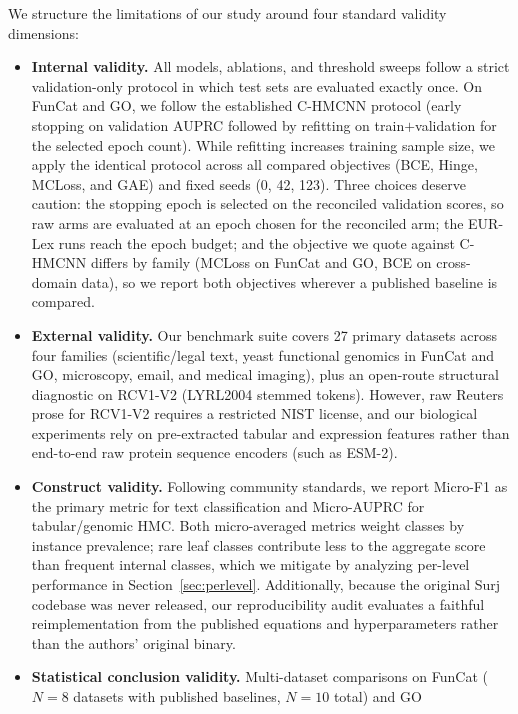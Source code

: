 \documentclass[preprint,12pt]{elsarticle}
\begin{document}
We structure the limitations of our study around four standard validity
dimensions:
\begin{itemize}[leftmargin=*,nosep]
  \item \textbf{Internal validity.} All models, ablations, and threshold sweeps
    follow a strict validation-only protocol in which test sets are evaluated
    exactly once. On FunCat and GO, we follow the established C-HMCNN protocol
    (early stopping on validation AUPRC followed by refitting on
    train$+$validation for the selected epoch count). While refitting increases
    training sample size, we apply the identical protocol across all compared
    objectives (BCE, Hinge, MCLoss, and GAE) and fixed seeds (0, 42, 123).
    Three choices deserve caution: the stopping epoch is selected on the
    reconciled validation scores, so raw arms are evaluated at an epoch chosen
    for the reconciled arm; the EUR-Lex runs reach the epoch budget; and the
    objective we quote against C-HMCNN differs by family (MCLoss on FunCat and
    GO, BCE on cross-domain data), so we report both objectives wherever a
    published baseline is compared.
  \item \textbf{External validity.} Our benchmark suite covers 27 primary
    datasets across four families (scientific/legal text, yeast functional
    genomics in FunCat and GO, microscopy, email, and medical imaging), plus an
    open-route structural diagnostic on RCV1-V2 (LYRL2004 stemmed tokens).
    However, raw Reuters prose for RCV1-V2 requires a restricted NIST license,
    and our biological experiments rely on pre-extracted tabular and expression
    features rather than end-to-end raw protein sequence encoders (such as
    ESM-2).
  \item \textbf{Construct validity.} Following community standards, we report
    Micro-F1 as the primary metric for text classification and Micro-AUPRC for
    tabular/genomic HMC. Both micro-averaged metrics weight classes by
    instance prevalence; rare leaf classes contribute less to the aggregate
    score than frequent internal classes, which we mitigate by analyzing
    per-level performance in Section~\ref{sec:perlevel}. Additionally, because
    the original Surj codebase was never released, our reproducibility audit
    evaluates a faithful reimplementation from the published equations and
    hyperparameters rather than the authors' original binary.
  \item \textbf{Statistical conclusion validity.} Multi-dataset comparisons on
    FunCat ($N{=}8$ datasets with published baselines, $N{=}10$ total) and GO

\end{itemize}
\end{document}
